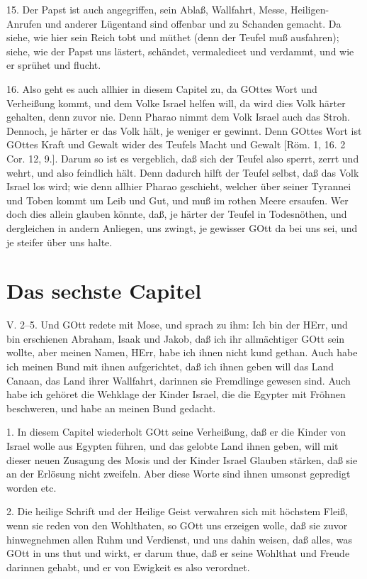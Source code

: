 15. Der Papst ist auch angegriffen, sein Ablaß, Wallfahrt, Messe, Heiligen-Anrufen und anderer Lügentand sind offenbar und zu Schanden gemacht. Da siehe, wie hier sein Reich tobt und müthet (denn der Teufel muß ausfahren); siehe, wie der Papst uns lästert, schändet, vermaledieet und verdammt, und wie er sprühet und flucht.

16. Also geht es auch allhier in diesem Capitel zu, da GOttes Wort und Verheißung kommt, und dem Volke Israel helfen will, da wird dies Volk härter gehalten, denn zuvor nie. Denn Pharao nimmt dem Volk Israel auch das Stroh. Dennoch, je härter er das Volk hält, je weniger er gewinnt. Denn GOttes Wort ist GOttes Kraft und Gewalt wider des Teufels Macht und Gewalt [Röm. 1, 16. 2 Cor. 12, 9.]. Darum so ist es vergeblich, daß sich der Teufel also sperrt, zerrt und wehrt, und also feindlich hält. Denn dadurch hilft der Teufel selbst, daß das Volk Israel los wird; wie denn allhier Pharao geschieht, welcher über seiner Tyrannei und Toben kommt um Leib und Gut, und muß im rothen Meere ersaufen. Wer doch dies allein glauben könnte, daß, je härter der Teufel in Todesnöthen, und dergleichen in andern Anliegen, uns zwingt, je gewisser GOtt da bei uns sei, und je steifer über uns halte.

\section{Das sechste Capitel}

\begin{schriftzitat}
V. 2–5. Und GOtt redete mit Mose, und sprach zu ihm: Ich bin der HErr, und bin erschienen Abraham, Isaak und Jakob, daß ich ihr allmächtiger GOtt sein wollte, aber meinen Namen, HErr, habe ich ihnen nicht kund gethan. Auch habe ich meinen Bund mit ihnen aufgerichtet, daß ich ihnen geben will das Land Canaan, das Land ihrer Wallfahrt, darinnen sie Fremdlinge gewesen sind. Auch habe ich gehöret die Wehklage der Kinder Israel, die die Egypter mit Fröhnen beschweren, und habe an meinen Bund gedacht.
\end{schriftzitat}

1. In diesem Capitel wiederholt GOtt seine Verheißung, daß er die Kinder von Israel wolle aus Egypten führen, und das gelobte Land ihnen geben, will mit dieser neuen Zusagung des Mosis und der Kinder Israel Glauben stärken, daß sie an der Erlösung nicht zweifeln. Aber diese Worte sind ihnen umsonst gepredigt worden etc.

2. Die heilige Schrift und der Heilige Geist verwahren sich mit höchstem Fleiß, wenn sie reden von den Wohlthaten, so GOtt uns erzeigen wolle, daß sie zuvor hinwegnehmen allen Ruhm und Verdienst, und uns dahin weisen, daß alles, was GOtt in uns thut und wirkt, er darum thue, daß er seine Wohlthat und Freude darinnen gehabt, und er von Ewigkeit es also verordnet.

